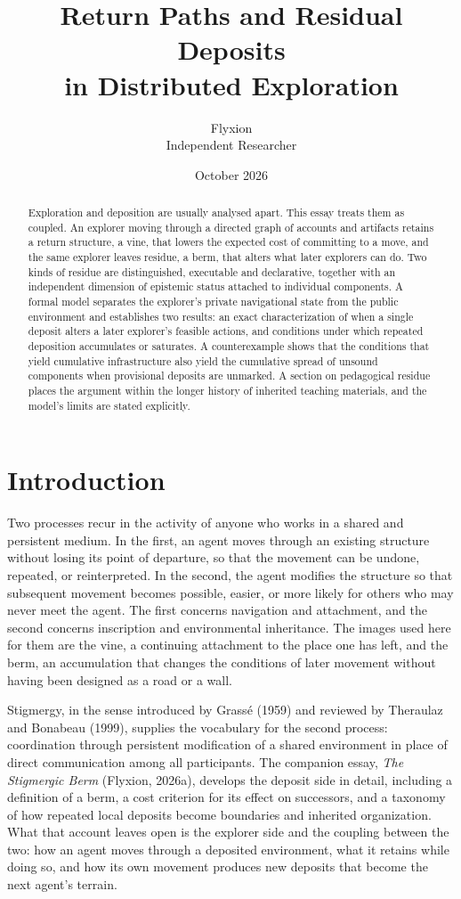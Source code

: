 \documentclass[11pt]{article}
\title{Return Paths and Residual Deposits\\ in Distributed Exploration}
\author{Flyxion\\ Independent Researcher}
\date{October 2026}
\theoremstyle{definition}
\theoremstyle{remark}
\begin{document}
\maketitle

\begin{abstract}
Exploration and deposition are usually analysed apart. This essay treats them as coupled. An explorer moving through a directed graph of accounts and artifacts retains a return structure, a vine, that lowers the expected cost of committing to a move, and the same explorer leaves residue, a berm, that alters what later explorers can do. Two kinds of residue are distinguished, executable and declarative, together with an independent dimension of epistemic status attached to individual components. A formal model separates the explorer's private navigational state from the public environment and establishes two results: an exact characterization of when a single deposit alters a later explorer's feasible actions, and conditions under which repeated deposition accumulates or saturates. A counterexample shows that the conditions that yield cumulative infrastructure also yield the cumulative spread of unsound components when provisional deposits are unmarked. A section on pedagogical residue places the argument within the longer history of inherited teaching materials, and the model's limits are stated explicitly.
\end{abstract}

\section{Introduction}

Two processes recur in the activity of anyone who works in a shared and persistent medium. In the first, an agent moves through an existing structure without losing its point of departure, so that the movement can be undone, repeated, or reinterpreted. In the second, the agent modifies the structure so that subsequent movement becomes possible, easier, or more likely for others who may never meet the agent. The first concerns navigation and attachment, and the second concerns inscription and environmental inheritance. The images used here for them are the vine, a continuing attachment to the place one has left, and the berm, an accumulation that changes the conditions of later movement without having been designed as a road or a wall.

Stigmergy, in the sense introduced by Grass\'e (1959) and reviewed by Theraulaz and Bonabeau (1999), supplies the vocabulary for the second process: coordination through persistent modification of a shared environment in place of direct communication among all participants. The companion essay, \emph{The Stigmergic Berm} (Flyxion, 2026a), develops the deposit side in detail, including a definition of a berm, a cost criterion for its effect on successors, and a taxonomy of how repeated local deposits become boundaries and inherited organization. What that account leaves open is the explorer side and the coupling between the two: how an agent moves through a deposited environment, what it retains while doing so, and how its own movement produces new deposits that become the next agent's terrain.
\end{document}
